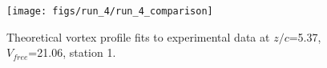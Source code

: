 \begin{figure}[H]
\centering
\texttt{[image: figs/run\_4/run\_4\_comparison]}
\caption{Theoretical vortex profile fits to experimental data at $z/c$=5.37, $V_{free}$=21.06, station 1.}
\label{fig:run_4_comparison}
\end{figure}



